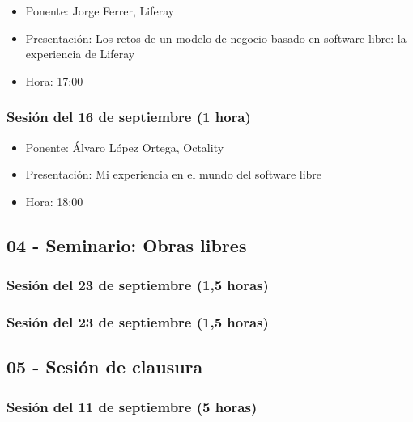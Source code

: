 \documentclass[a4paper,12pt]{article}
\begin{document}
\begin{itemize}
\item Ponente: Jorge Ferrer, Liferay
\item Presentación: Los retos de un modelo de negocio basado en software libre: la experiencia de Liferay
\item Hora: 17:00
\end{itemize}

\subsubsection{Sesión del 16 de septiembre (1 hora)}

\begin{itemize}
\item Ponente: Álvaro López Ortega, Octality
\item Presentación: Mi experiencia en el mundo del software libre
\item Hora: 18:00
\end{itemize}

\subsection{04 - Seminario: Obras libres}

\subsubsection{Sesión del 23 de septiembre (1,5 horas)}

\subsubsection{Sesión del 23 de septiembre (1,5 horas)}


\subsection{05 - Sesión de clausura}

\subsubsection{Sesión del 11 de septiembre (5 horas)}
\end{document}
